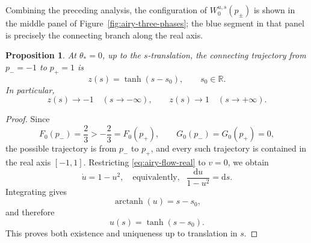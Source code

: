 \documentclass[11pt]{amsart}
\theoremstyle{plain}
\newtheorem{prop}[thm]{Proposition}
\newcommand{\R}{\mathbb R}
\newcommand{\dd}{\mathrm d}
\begin{document}
Combining the preceding analysis, the configuration of $W_0^{u,s}(p_{\pm})$ is shown in the middle panel of Figure~\ref{fig:airy-three-phases}; the blue segment in that panel is precisely the connecting branch along the real axis.

\begin{prop}\label{prop:airy-exact-trajectory}
At \(\theta_*=0\), up to the $s$-translation, the connecting trajectory from \(p_-=-1\) to \(p_+=1\) is
\begin{equation*}
z(s)=\tanh(s-s_0),
\qquad s_0\in\R.
\end{equation*}
In particular,
\begin{equation*}
z(s)\to -1\quad (s\to-\infty),
\qquad
z(s)\to 1\quad (s\to+\infty).
\end{equation*}
\end{prop}

\begin{proof}
Since
\begin{equation*}
F_0(p_-)=\frac23>-\frac23=F_0(p_+),\qquad G_0(p_-)=G_0(p_+)=0,
\end{equation*}
the possible trajectory is from $p_-$ to $p_+$, and every such trajectory is contained in the real axis $[-1,1]$. Restricting \eqref{eq:airy-flow-real} to \(v=0\), we obtain
\begin{equation*}\label{eq:airy-real-axis-flow}
\dot u=1-u^2,\quad \text{equivalently, }~~ \frac{\dd u}{1-u^2}=\dd s.
\end{equation*}
Integrating gives
\begin{equation*}
\operatorname{arctanh}(u)=s-s_0,
\end{equation*}
and therefore
\begin{equation*}
u(s)=\tanh(s-s_0).
\end{equation*}
This proves both existence and uniqueness up to translation in \(s\).
\end{proof}
\end{document}
